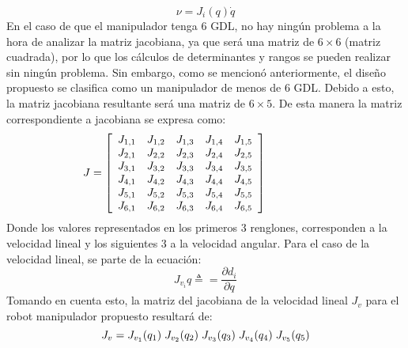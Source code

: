 \documentclass[journal]{IEEEtran}
\begin{document}
    \begin{equation*}
        \nu = J_i (q)\dot{q}
    \end{equation*}
    En el caso de que el manipulador tenga 6 GDL, no hay ningún problema a la hora de analizar la matriz jacobiana,
    ya que será una matriz de $ 6 \times  6 $ (matriz cuadrada), por lo que los cálculos de determinantes y rangos
    se pueden realizar sin ningún problema. Sin embargo, como se mencionó anteriormente, el diseño propuesto se
    clasifica como un manipulador de menos de 6 GDL. Debido a esto, la matriz jacobiana resultante será una matriz
    de $ 6 \times 5 $.
    \vspace{2mm}
    De esta manera la matriz correspondiente a jacobiana se expresa como:
    \begin{equation*}
        \hspace{-10mm}
        J = \left[
            \begin{array}{ccccc}
                J_{1,1} & J_{1,2} & J_{1,3} & J_{1,4} & J_{1,5}\\
                J_{2,1} & J_{2,2} & J_{2,3} & J_{2,4} & J_{2,5}\\
                J_{3,1} & J_{3,2} & J_{3,3} & J_{3,4} & J_{3,5}\\
                J_{4,1} & J_{4,2} & J_{4,3} & J_{4,4} & J_{4,5}\\
                J_{5,1} & J_{5,2} & J_{5,3} & J_{5,4} & J_{5,5}\\
                J_{6,1} & J_{6,2} & J_{6,3} & J_{6,4} & J_{6,5}\\
            \end{array}\right] 
        \hspace{10mm}
    \end{equation*} 
    Donde los valores representados en los primeros 3 renglones, corresponden a la velocidad lineal y los siguientes
    3 a la velocidad angular. 
    Para el caso de la velocidad lineal, se parte de la ecuación:
    \begin{equation*}
        J_{v_i} q \triangleq = \frac{\partial d_i}{\partial q}
    \end{equation*}
    Tomando en cuenta esto, la matriz del jacobiana de la velocidad lineal $J_{v}$ para el robot manipulador propuesto
    resultará de:
    \begin{equation*}
        J_v = J_{v_1}(q_1) \hspace{1mm} J_{v_2}(q_2) \hspace{1mm} J_{v_3}(q_3) \hspace{1mm} J_{v_4}(q_4) \hspace{1mm} J_{v_5}(q_5)
    \end{equation*}
\end{document}
